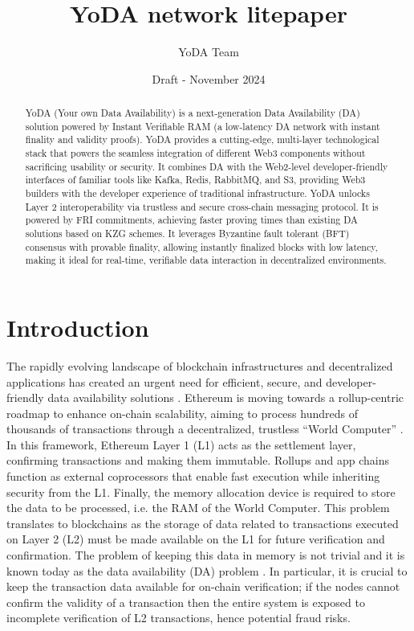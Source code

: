 \documentclass[11pt]{article}
\title{YoDA network litepaper}
\author{YoDA Team}
\date{Draft - November 2024}
\begin{document}
\maketitle

\begin{abstract}
YoDA (Your own Data Availability) is a next-generation Data Availability (DA) solution powered by Instant Verifiable RAM (a low-latency DA network with instant finality and validity proofs). YoDA provides a cutting-edge, multi-layer technological stack that powers the seamless integration of different Web3 components without sacrificing usability or security. It combines DA with the Web2-level developer-friendly interfaces of familiar tools like Kafka, Redis, RabbitMQ, and S3, providing Web3 builders with the developer experience of traditional infrastructure. YoDA unlocks Layer 2 interoperability via trustless and secure cross-chain messaging protocol. It is powered by FRI commitments, achieving faster proving times than existing DA solutions based on KZG schemes. It leverages Byzantine fault tolerant (BFT) consensus with provable finality, allowing instantly finalized blocks with low latency, making it ideal for real-time, verifiable data interaction in decentralized environments.
\end{abstract}

\tableofcontents

\section{Introduction}
The rapidly evolving landscape of blockchain infrastructures and decentralized applications has created an urgent need for efficient, secure, and developer-friendly data availability solutions \cite{hasw:2023/1079}. Ethereum is moving towards a rollup-centric roadmap to enhance on-chain scalability, aiming to process hundreds of thousands of transactions through a decentralized, trustless “World Computer” \cite{inevitableeth}. In this framework, Ethereum Layer 1 (L1) acts as the settlement layer, confirming transactions and making them immutable. Rollups and app chains function as external coprocessors that enable fast execution while inheriting security from the L1. Finally, the memory allocation device is required to store the data to be processed, i.e. the RAM of the World Computer. This problem translates to blockchains as the storage of data related to transactions executed on Layer 2 (L2) must be made available on the L1 for future verification and confirmation. The problem of keeping this data in memory is not trivial and it is known today as the data availability (DA) problem \cite{hasw:2023/1079, AlBass18}. In particular, it is crucial to keep the transaction data available for on-chain verification; if the nodes cannot confirm the validity of a transaction then the entire system is exposed to incomplete verification of L2 transactions, hence potential fraud risks. 
\end{document}
